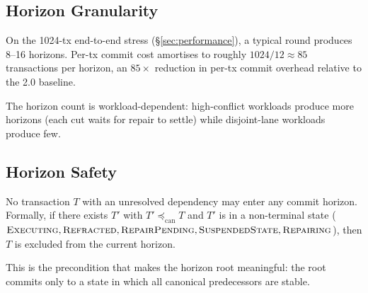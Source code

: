 \subsection{Horizon Granularity}

\begin{remark}
\label{rem:horizon-count}
On the 1024-tx end-to-end stress (\S\ref{sec:performance}), a
typical round produces 8--16 horizons. Per-tx commit cost amortises
to roughly $1024 / 12 \approx 85$ transactions per horizon, an
$85\times$ reduction in per-tx commit overhead relative to the
2.0 baseline.
\end{remark}

The horizon count is workload-dependent: high-conflict workloads
produce more horizons (each cut waits for repair to settle) while
disjoint-lane workloads produce few.

\subsection{Horizon Safety}

\begin{invariant}
\label{inv:horizon-safety}
No transaction $T$ with an unresolved dependency may enter any
commit horizon. Formally, if there exists $T'$ with
$T' \preceq_{\mathrm{can}} T$ and $T'$ is in a non-terminal state
($\textsc{Executing}, \textsc{Refracted}, \textsc{RepairPending},
\textsc{SuspendedState}, \textsc{Repairing}$), then $T$ is excluded
from the current horizon.
\end{invariant}

This is the precondition that makes the horizon root meaningful:
the root commits only to a state in which all canonical predecessors
are stable.


